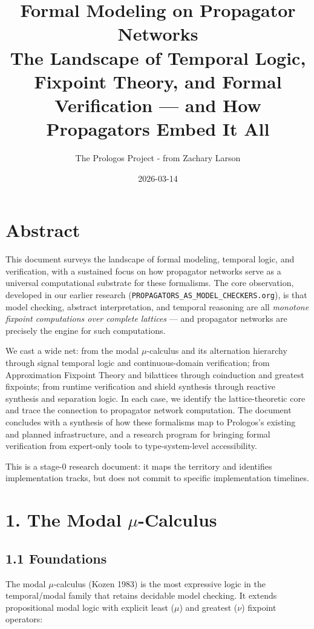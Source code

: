 \documentclass[11pt]{article}
\author{The Prologos Project - from Zachary Larson}
\date{2026-03-14}
\title{Formal Modeling on Propagator Networks\\\medskip
\large The Landscape of Temporal Logic, Fixpoint Theory, and Formal Verification --- and How Propagators Embed It All}
\begin{document}
\maketitle
\tableofcontents

\section{Abstract}
\label{sec:orged3eafc}

This document surveys the landscape of formal modeling, temporal logic, and
verification, with a sustained focus on how propagator networks serve as a
universal computational substrate for these formalisms. The core observation,
developed in our earlier research (\texttt{PROPAGATORS\_AS\_MODEL\_CHECKERS.org}), is
that model checking, abstract interpretation, and temporal reasoning are all
\emph{monotone fixpoint computations over complete lattices} --- and propagator
networks are precisely the engine for such computations.

We cast a wide net: from the modal \(\mu\)-calculus and its alternation hierarchy
through signal temporal logic and continuous-domain verification; from
Approximation Fixpoint Theory and bilattices through coinduction and greatest
fixpoints; from runtime verification and shield synthesis through reactive
synthesis and separation logic. In each case, we identify the lattice-theoretic
core and trace the connection to propagator network computation. The document
concludes with a synthesis of how these formalisms map to Prologos's existing
and planned infrastructure, and a research program for bringing formal
verification from expert-only tools to type-system-level accessibility.

This is a stage-0 research document: it maps the territory and identifies
implementation tracks, but does not commit to specific implementation timelines.
\section{1. The Modal \(\mu\)-Calculus}
\label{sec:orgaefd4df}

\subsection{1.1 Foundations}
\label{sec:orga8cd2ad}

The modal \(\mu\)-calculus (Kozen 1983) is the most expressive logic in the
temporal/modal family that retains decidable model checking. It extends
propositional modal logic with explicit least (\(\mu\)) and greatest (\(\nu\)) fixpoint
operators:
\end{document}
